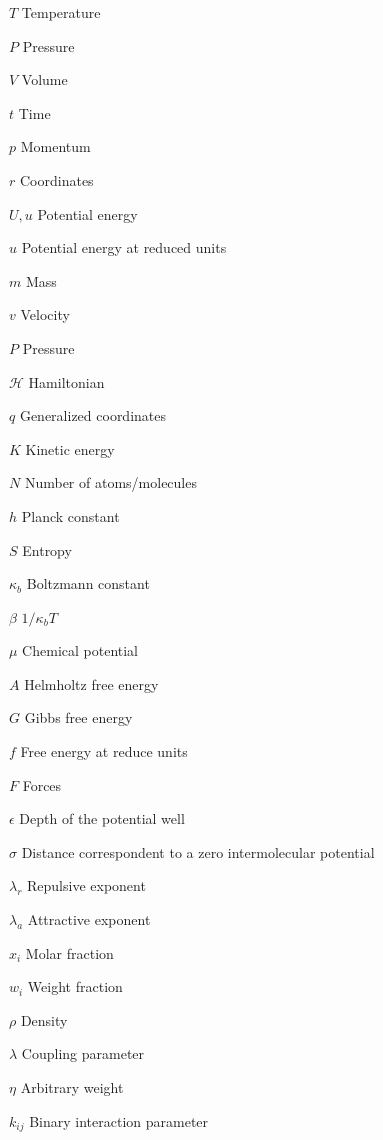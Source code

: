 \documentclass[
	12pt,				%
	openany,			%
	oneside,			%
	a4paper,			%
	english,			%
	brazil				%
	]{abntex2}
\begin{document}
\begin{simbolos}
  \item[$T$] Temperature
  \item[$P$] Pressure
  \item[$V$] Volume
  \item[$t$] Time
  \item[$p$] Momentum
  \item[$r$] Coordinates
  \item[$U,u$] Potential energy
  \item[$u$] Potential energy at reduced units
  \item[$m$] Mass
  \item[$v$] Velocity
  \item[$P$] Pressure
  \item[$ \mathcal{H} $] Hamiltonian
  \item[$q$] Generalized coordinates
  \item[$K $] 	Kinetic energy 
  \item[$N$] Number of atoms/molecules
  \item[$h$] Planck constant
  \item[$S$] Entropy
  \item[$\kappa_{b}$] Boltzmann constant
  \item[$\beta$] $1/\kappa_{b}T$
  \item[$\mu$] Chemical potential
  \item[$A$] Helmholtz free energy
  \item[$G$] Gibbs free energy
  \item[$f$] Free energy at reduce units
  \item[$F$] Forces
  \item[$\epsilon$] Depth of the potential well
  \item[$\sigma$] Distance correspondent to a zero intermolecular potential
  \item[$\lambda _{r}$] Repulsive exponent
  \item[$\lambda _{a}$] Attractive exponent
  \item[$x_{i}$] Molar fraction 
  \item[$w_{i}$] Weight fraction 
  \item[$\rho$] Density
  \item[$\lambda$] Coupling parameter 
  \item[$\eta$] Arbitrary weight 
  \item[$k_{ij}$] Binary interaction parameter
\end{simbolos}
\end{document}
